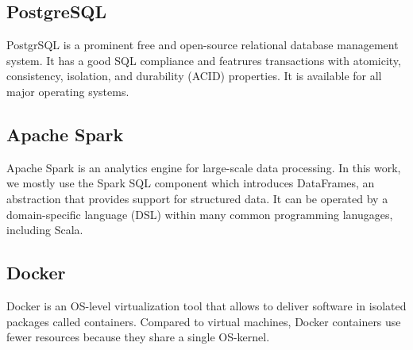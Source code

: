 \subsection{PostgreSQL}
PostgrSQL is a prominent free and open-source relational database management system.
It has a good SQL compliance and featrures transactions with atomicity, consistency, isolation, and durability (ACID) properties.
It is available for all major operating systems.

\subsection{Apache Spark}
Apache Spark is an analytics engine for large-scale data processing.
In this work, we mostly use the Spark SQL component which introduces DataFrames, an abstraction that provides support for structured data.
It can be operated by a domain-specific language (DSL) within many common programming lanugages, including Scala.

\subsection{Docker}
Docker is an OS-level virtualization tool that allows to deliver software in isolated packages called containers.
Compared to virtual machines, Docker containers use fewer resources because they share a single OS-kernel.
